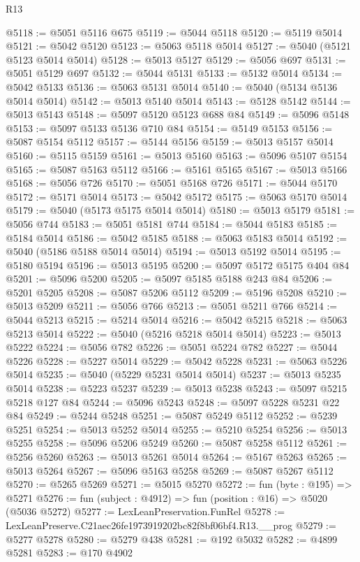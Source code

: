 \begin{lexlean}{R13}
\begin{coremodule}
@5118 := @5051 @5116 @675
@5119 := @5044 @5118
@5120 := @5119 @5014
@5121 := @5042 @5120
@5123 := @5063 @5118 @5014
@5127 := @5040 (@5121 @5123 @5014 @5014)
@5128 := @5013 @5127
@5129 := @5056 @697
@5131 := @5051 @5129 @697
@5132 := @5044 @5131
@5133 := @5132 @5014
@5134 := @5042 @5133
@5136 := @5063 @5131 @5014
@5140 := @5040 (@5134 @5136 @5014 @5014)
@5142 := @5013 @5140 @5014
@5143 := @5128 @5142
@5144 := @5013 @5143
@5148 := @5097 @5120 @5123 @688 @84
@5149 := @5096 @5148
@5153 := @5097 @5133 @5136 @710 @84
@5154 := @5149 @5153
@5156 := @5087 @5154 @5112
@5157 := @5144 @5156
@5159 := @5013 @5157 @5014
@5160 := @5115 @5159
@5161 := @5013 @5160
@5163 := @5096 @5107 @5154
@5165 := @5087 @5163 @5112
@5166 := @5161 @5165
@5167 := @5013 @5166
@5168 := @5056 @726
@5170 := @5051 @5168 @726
@5171 := @5044 @5170
@5172 := @5171 @5014
@5173 := @5042 @5172
@5175 := @5063 @5170 @5014
@5179 := @5040 (@5173 @5175 @5014 @5014)
@5180 := @5013 @5179
@5181 := @5056 @744
@5183 := @5051 @5181 @744
@5184 := @5044 @5183
@5185 := @5184 @5014
@5186 := @5042 @5185
@5188 := @5063 @5183 @5014
@5192 := @5040 (@5186 @5188 @5014 @5014)
@5194 := @5013 @5192 @5014
@5195 := @5180 @5194
@5196 := @5013 @5195
@5200 := @5097 @5172 @5175 @404 @84
@5201 := @5096 @5200
@5205 := @5097 @5185 @5188 @243 @84
@5206 := @5201 @5205
@5208 := @5087 @5206 @5112
@5209 := @5196 @5208
@5210 := @5013 @5209
@5211 := @5056 @766
@5213 := @5051 @5211 @766
@5214 := @5044 @5213
@5215 := @5214 @5014
@5216 := @5042 @5215
@5218 := @5063 @5213 @5014
@5222 := @5040 (@5216 @5218 @5014 @5014)
@5223 := @5013 @5222
@5224 := @5056 @782
@5226 := @5051 @5224 @782
@5227 := @5044 @5226
@5228 := @5227 @5014
@5229 := @5042 @5228
@5231 := @5063 @5226 @5014
@5235 := @5040 (@5229 @5231 @5014 @5014)
@5237 := @5013 @5235 @5014
@5238 := @5223 @5237
@5239 := @5013 @5238
@5243 := @5097 @5215 @5218 @127 @84
@5244 := @5096 @5243
@5248 := @5097 @5228 @5231 @22 @84
@5249 := @5244 @5248
@5251 := @5087 @5249 @5112
@5252 := @5239 @5251
@5254 := @5013 @5252 @5014
@5255 := @5210 @5254
@5256 := @5013 @5255
@5258 := @5096 @5206 @5249
@5260 := @5087 @5258 @5112
@5261 := @5256 @5260
@5263 := @5013 @5261 @5014
@5264 := @5167 @5263
@5265 := @5013 @5264
@5267 := @5096 @5163 @5258
@5269 := @5087 @5267 @5112
@5270 := @5265 @5269
@5271 := @5015 @5270
@5272 := fun (byte : @195) => @5271
@5276 := fun (subject : @4912) => fun (position : @16) => @5020 (@5036 @5272)
@5277 := LexLeanPreservation.FunRel
@5278 := LexLeanPreserve.C21aec26fe1973919202bc82f8bf06bf4.R13.__prog
@5279 := @5277 @5278
@5280 := @5279 @438
@5281 := @192 @5032
@5282 := @4899 @5281
@5283 := @170 @4902

\end{coremodule}
\end{lexlean}
